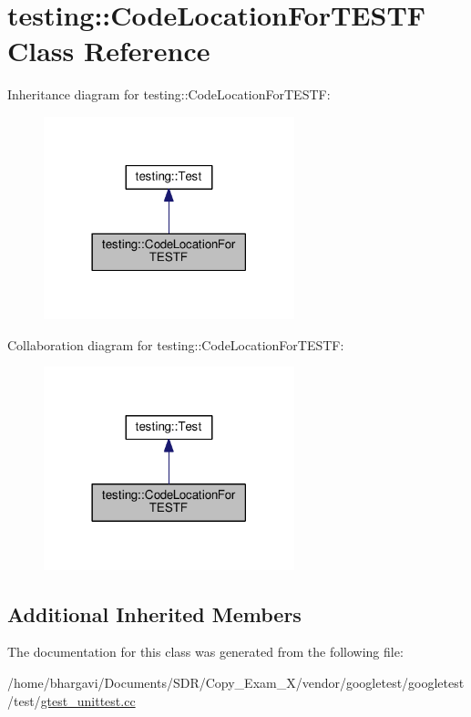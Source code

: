 \hypertarget{classtesting_1_1_code_location_for_t_e_s_t_f}{}\section{testing\+:\+:Code\+Location\+For\+T\+E\+S\+TF Class Reference}
\label{classtesting_1_1_code_location_for_t_e_s_t_f}


Inheritance diagram for testing\+:\+:Code\+Location\+For\+T\+E\+S\+TF\+:
\nopagebreak
\begin{figure}[H]
\begin{center}
\leavevmode
\includegraphics[width=206pt]{classtesting_1_1_code_location_for_t_e_s_t_f__inherit__graph}
\end{center}
\end{figure}


Collaboration diagram for testing\+:\+:Code\+Location\+For\+T\+E\+S\+TF\+:
\nopagebreak
\begin{figure}[H]
\begin{center}
\leavevmode
\includegraphics[width=206pt]{classtesting_1_1_code_location_for_t_e_s_t_f__coll__graph}
\end{center}
\end{figure}
\subsection*{Additional Inherited Members}


The documentation for this class was generated from the following file\+:\begin{DoxyCompactItemize}
\item 
/home/bhargavi/\+Documents/\+S\+D\+R/\+Copy\+\_\+\+Exam\+\_\+X/vendor/googletest/googletest/test/\hyperlink{gtest__unittest_8cc}{gtest\+\_\+unittest.\+cc}\end{DoxyCompactItemize}

